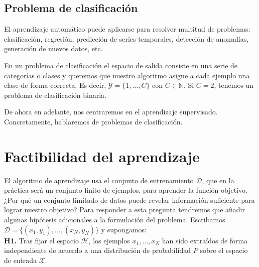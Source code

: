 \subsection{Problema de clasificación}
El aprendizaje automático puede aplicarse para resolver multitud de problemas: clasificación, regresión, predicción de series temporales, detección de anomalías, generación de nuevos datos, etc.

En un problema de clasificación el espacio de salida consiste en una serie de categorías o clases y queremos que nuestro algoritmo asigne a cada ejemplo una clase de forma correcta. Es decir, $\mathcal{Y} = \{ 1, \ldots, C\}$ con $C \in \mathbb{N}$. Si $C=2$, tenemos un problema de clasificación binaria. 

De ahora en adelante, nos centraremos en el aprendizaje supervisado. Concretamente, hablaremos de problemas de clasificación.  

\section{Factibilidad del aprendizaje}
El algoritmo de aprendizaje usa el conjunto de entrenamiento $\mathcal{D}$, que en la práctica será un conjunto finito de ejemplos, para aprender la función objetivo. ¿Por qué un conjunto limitado de datos puede revelar información suficiente para lograr nuestro objetivo? Para responder a esta pregunta tendremos que añadir algunas hipótesis adicionales a la formulación del problema. Escribamos $\mathcal{D}=\{ (x_1, y_1), \ldots, (x_N, y_N) \}$ y supongamos:\\

\noindent
\textbf{H1.} Tras fijar el espacio $\mathcal{H}$, los ejemplos $x_1, \ldots, x_N$ han sido extraídos de forma independiente de acuerdo a una distribución de probabilidad $P$ sobre el espacio de entrada $\mathcal{X}$.\\ 

